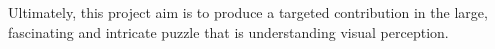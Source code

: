 Ultimately, this project aim is to produce a targeted contribution in the large, fascinating and intricate puzzle that is understanding visual perception.







